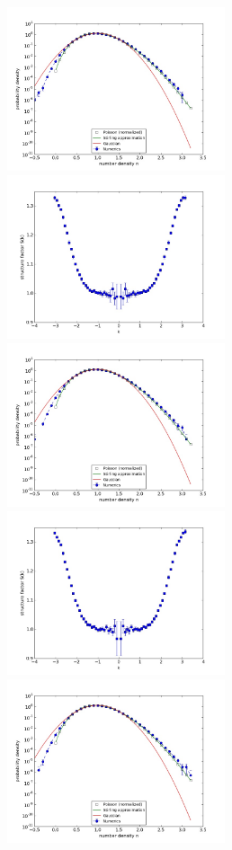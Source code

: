 \documentclass{article}
\begin{document}
\begin{figure}
\begin{center}
\end{center}
\includegraphics[width=0.5\linewidth,height=1.9in]{fig1/appendix_exp_diff_dt0.25_hist_mid1.jpg}
\includegraphics[width=0.5\linewidth,height=1.9in]{fig1/appendix_exp_diff_dt0.25_Sk_mid1.jpg}
\includegraphics[width=0.5\linewidth,height=1.9in]{fig1/appendix_exp_diff_dt0.25_hist_mid2.jpg}
\includegraphics[width=0.5\linewidth,height=1.9in]{fig1/appendix_exp_diff_dt0.25_Sk_mid2.jpg}
\includegraphics[width=0.5\linewidth,height=1.9in]{fig1/appendix_exp_diff_dt0.25_hist_mid3.jpg}

\end{figure}
\end{document}

